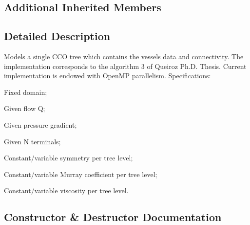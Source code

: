 \subsection*{Additional Inherited Members}


\subsection{Detailed Description}
Models a single C\+CO tree which contains the vessel\textquotesingle{}s data and connectivity. The implementation corresponds to the algorithm 3 of Queiroz Ph.\+D. Thesis. Current implementation is endowed with Open\+MP parallelism. Specifications\+:
\begin{DoxyItemize}
\item Fixed domain;
\item Given flow Q;
\item Given pressure gradient;
\item Given N terminals;
\item Constant/variable symmetry per tree level;
\item Constant/variable Murray coefficient per tree level;
\item Constant/variable viscosity per tree level. 
\end{DoxyItemize}

\subsection{Constructor \& Destructor Documentation}
\mbox{\label{class_fixed_radius_root_c_c_o_tree_legacy_a423950865b90803617be124a13e8b660}} 
